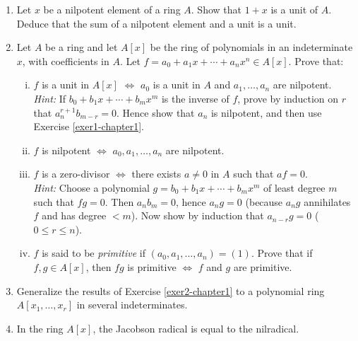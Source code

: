 
\begin{enumerate}
    \item \label{exer1-chapter1}Let $x$ be a nilpotent element of a ring $A$. Show that $1 + x$ is a unit of $A$. Deduce that the sum of a nilpotent element and a unit is a unit.

    \item \label{exer2-chapter1}Let $A$ be a ring and let $A[x]$ be the ring of polynomials in an indeterminate $x$, with coefficients in $A$. Let $f = a_0 + a_1 x + \cdots + a_n x^n \in A[x]$. Prove that:
    \begin{enumerate}[i)]
        \item $f$ is a unit in $A[x]$ $\iff$ $a_0$ is a unit in $A$ and $a_1, \ldots, a_n$ are nilpotent.\\
        \textit{Hint:} If $b_0 + b_1 x + \cdots + b_m x^m$ is the inverse of $f$, prove by induction on $r$ that $a_n^{r+1} b_{m-r} = 0$. Hence show that $a_n$ is nilpotent, and then use Exercise \ref{exer1-chapter1}.
        \item $f$ is nilpotent $\iff$ $a_0, a_1, \ldots, a_n$ are nilpotent.
        \item $f$ is a zero-divisor $\iff$ there exists $a \neq 0$ in $A$ such that $af = 0$.\\
        \textit{Hint:} Choose a polynomial $g = b_0 + b_1 x + \cdots + b_m x^m$ of least degree $m$ such that $fg = 0$. Then $a_n b_m = 0$, hence $a_n g = 0$ (because $a_n g$ annihilates $f$ and has degree $< m$). Now show by induction that $a_{n-r} g = 0$ ($0 \leq r \leq n$).
        \item $f$ is said to be \emph{primitive} if $(a_0, a_1, \ldots, a_n) = (1)$. Prove that if $f, g \in A[x]$, then $fg$ is primitive $\iff$ $f$ and $g$ are primitive.
    \end{enumerate}

    \item \label{exer3-chapter1}Generalize the results of Exercise \ref{exer2-chapter1} to a polynomial ring $A[x_1, \ldots, x_r]$ in several indeterminates.

    \item \label{exer4-chapter1}In the ring $A[x]$, the Jacobson radical is equal to the nilradical.


\end{enumerate}
